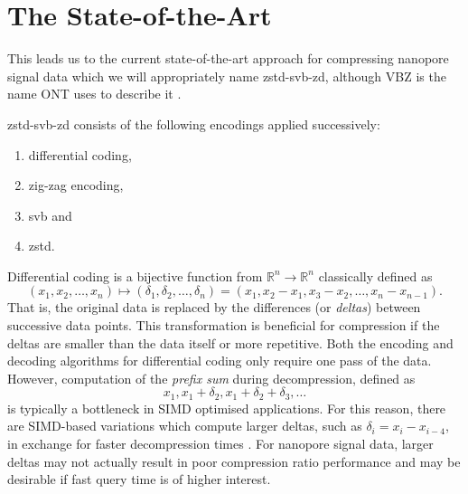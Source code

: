 \section{The State-of-the-Art}
\label{sec:state-of-the-art}

This leads us to the current state-of-the-art approach for compressing nanopore
signal data which we will appropriately name zstd-svb-zd, although VBZ is the
name ONT uses to describe it \cite{vbz}.


zstd-svb-zd consists of the following encodings applied successively:
\begin{enumerate}
\item differential coding,
\item zig-zag encoding,
\item svb and
\item zstd.
\end{enumerate}

Differential coding is a bijective function from $\mathbb{R}^n\to\mathbb{R}^n$ classically defined as
\[ (x_1, x_2, \dots, x_n) \mapsto (\delta_1,\delta_2,\dots,\delta_n) = (x_1, x_2 - x_1, x_3-x_2,\dots,x_n-x_{n-1}). \]
That is, the original data is replaced by the differences (or \textit{deltas}) between successive data points.
This transformation is beneficial for compression if the deltas are smaller than
the data itself or more repetitive.
Both the encoding and decoding algorithms for differential coding only require one pass of the data.
However, computation of the \textit{prefix sum} during decompression, defined as
\[ x_1, x_1 + \delta_2, x_1 + \delta_2 + \delta_3, \dots \]
is typically a bottleneck in SIMD optimised applications.
For this reason, there are SIMD-based variations which compute larger deltas, such as $\delta_i = x_i - x_{i-4}$, in exchange for faster decompression times \cite{lemire-simd}.
For nanopore signal data, larger deltas may not actually result in poor compression ratio performance and may be desirable if fast query time is of higher interest.

